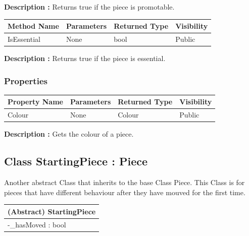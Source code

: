\documentclass[12pt]{article}
\begin{document}
\textbf{Description :} Returns true if the piece is promotable.

\begin{table}[H]
    \begin{tabular}{|l|l|l|l|}
    \hline
    \rowcolor[HTML]{EFEFEF} 
    \cellcolor[HTML]{EFEFEF}\textbf{Method Name} & \textbf{Parameters}  & \textbf{Returned Type} & \textbf{Visibility} \\ \hline
    IsEssential                                  & None                 & bool                   & Public              \\ \hline
    \end{tabular}
\end{table}

\textbf{Description :} Returns true if the piece is essential.

\subsubsection{Properties}

\begin{table}[H]
    \begin{tabular}{|l|l|l|l|}
    \hline
    \rowcolor[HTML]{EFEFEF} 
    \cellcolor[HTML]{EFEFEF}\textbf{Property Name} & \textbf{Parameters}  & \textbf{Returned Type} & \textbf{Visibility} \\ \hline
    Colour                                         & None                 & Colour                 & Public              \\ \hline
    \end{tabular}
\end{table}

\textbf{Description :} Gets the colour of a piece.
\newpage


\subsection{Class StartingPiece : Piece}

Another abstract Class that inherits to the base Class Piece.
This Class is for pieces that have different behaviour after they
have mouved for the first time.

\begin{table}[H]
    \begin{tabular}{|l|}
    \hline
    \cellcolor[HTML]{C0C0C0}\textbf{(Abstract) StartingPiece}            \\ \hline
    \cellcolor[HTML]{EFEFEF}-\_hasMoved : bool        \\ \hline
    \end{tabular}
\end{table}
\end{document}
